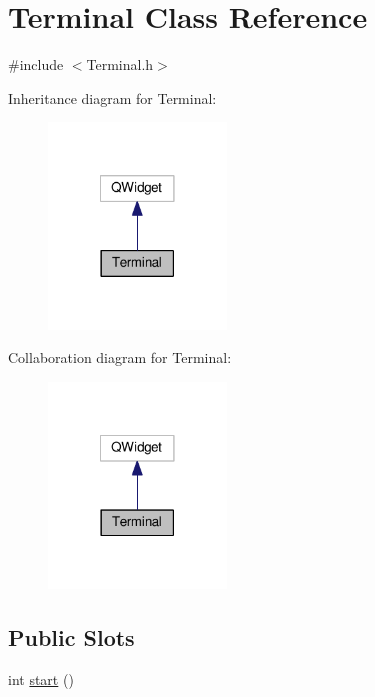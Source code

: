 \hypertarget{class_terminal}{\section{Terminal Class Reference}
\label{class_terminal}
}


{\ttfamily \#include $<$Terminal.\-h$>$}



Inheritance diagram for Terminal\-:\nopagebreak
\begin{figure}[H]
\begin{center}
\leavevmode
\includegraphics[width=134pt]{class_terminal__inherit__graph}
\end{center}
\end{figure}


Collaboration diagram for Terminal\-:\nopagebreak
\begin{figure}[H]
\begin{center}
\leavevmode
\includegraphics[width=134pt]{class_terminal__coll__graph}
\end{center}
\end{figure}
\subsection*{Public Slots}
\begin{DoxyCompactItemize}
\item 
int \hyperlink{class_terminal_aab08ef06e15138f44838f2f643cdb70e}{start} ()
\end{DoxyCompactItemize}
